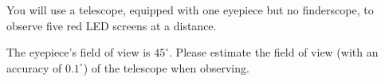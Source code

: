You will use a telescope, equipped with one eyepiece but no finderscope, to
observe five red LED screens at a distance.

The eyepiece's field of view is $45^\circ$. Please estimate the field of
view (with an accuracy of $0.1^\circ$) of the telescope when observing.

